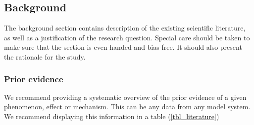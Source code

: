 \subsection{Background} 
\begin{prereg}
\begin{instruction}
The background section contains description of the existing scientific literature, as well as a justification of the research question. Special care should be taken to make sure that the section is even-handed and bias-free. It should also present the rationale for the study.
\end{instruction}
\end{prereg}

\subsubsection{Prior evidence}
\begin{prereg}
\begin{instruction}
We recommend providing a systematic overview of the prior evidence of a given phenomenon, effect or mechanism. This can be any data from any model system. We recommend displaying this information in a table (\cref{tbl_literature})
\end{instruction}
\end{prereg}




